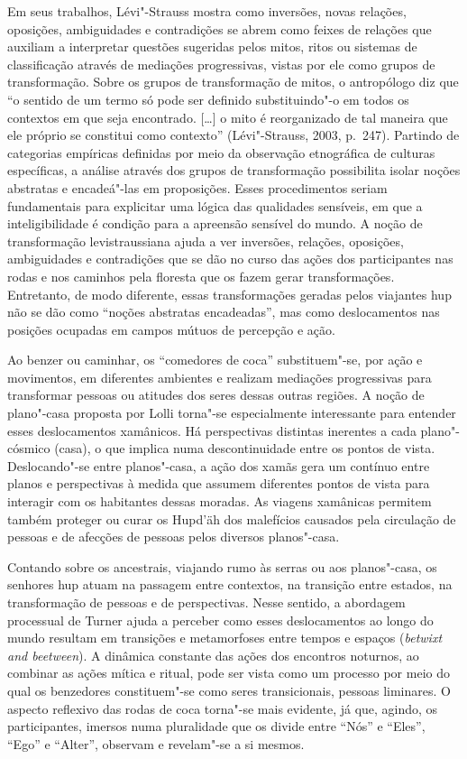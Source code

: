 Em seus trabalhos, Lévi"-Strauss mostra como inversões, novas relações,
oposições, ambiguidades e contradições se abrem como feixes de relações
que auxiliam a interpretar questões sugeridas pelos mitos, ritos ou
sistemas de classificação através de mediações progressivas, vistas por
ele como grupos de transformação. Sobre os grupos de transformação de
mitos, o antropólogo diz que ``o sentido de um termo só pode ser
definido substituindo"-o em todos os contextos em que seja encontrado.
{[}\ldots{}{]} o mito é reorganizado de tal maneira que ele próprio se
constitui como contexto'' (Lévi"-Strauss, 2003, p.~247). Partindo de
categorias empíricas definidas por meio da observação etnográfica de
culturas específicas, a análise através dos grupos de transformação
possibilita isolar noções abstratas e encadeá"-las em proposições. Esses
procedimentos seriam fundamentais para explicitar uma lógica das
qualidades sensíveis, em que a inteligibilidade é condição para a
apreensão sensível do mundo. A noção de transformação levistraussiana
ajuda a ver inversões, relações, oposições, ambiguidades e contradições
que se dão no curso das ações dos participantes nas rodas e nos caminhos
pela floresta que os fazem gerar transformações. Entretanto, de modo
diferente, essas transformações geradas pelos viajantes hup não se dão
como ``noções abstratas encadeadas'', mas como deslocamentos nas
posições ocupadas em campos mútuos de percepção e ação.

Ao benzer ou caminhar, os ``comedores de coca'' substituem"-se, por ação
e movimentos, em diferentes ambientes e realizam mediações progressivas
para transformar pessoas ou atitudes dos seres dessas outras regiões. A
noção de plano"-casa proposta por Lolli torna"-se especialmente
interessante para entender esses deslocamentos xamânicos. Há
perspectivas distintas inerentes a cada plano"-cósmico (casa), o que
implica numa descontinuidade entre os pontos de vista. Deslocando"-se
entre planos"-casa, a ação dos xamãs gera um contínuo entre planos e
perspectivas à medida que assumem diferentes pontos de vista para
interagir com os habitantes dessas moradas. As viagens xamânicas
permitem também proteger ou curar os Hupd'äh dos malefícios causados
pela circulação de pessoas e de afecções de pessoas pelos diversos
planos"-casa.

Contando sobre os ancestrais, viajando rumo às serras ou aos
planos"-casa, os senhores hup atuam na passagem entre contextos, na
transição entre estados, na transformação de pessoas e de perspectivas.
Nesse sentido, a abordagem processual de Turner ajuda a perceber como
esses deslocamentos ao longo do mundo resultam em transições e
metamorfoses entre tempos e espaços (\emph{betwixt and beetween}). A
dinâmica constante das ações dos encontros noturnos, ao combinar as
ações mítica e ritual, pode ser vista como um processo por meio do qual
os benzedores constituem"-se como seres transicionais, pessoas liminares.
O aspecto reflexivo das rodas de coca torna"-se mais evidente, já que,
agindo, os participantes, imersos numa pluralidade que os divide entre
``Nós'' e ``Eles'', ``Ego'' e ``Alter'', observam e revelam"-se a si
mesmos.

